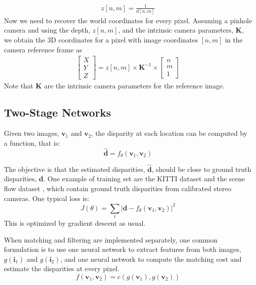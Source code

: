 \begin{align}
    z \left[n,m \right] = \frac{1}{ d \left[n,m \right] }
\end{align}
Now we need to recover the world coordinates for every pixel.
Assuming a pinhole camera and using the depth, $z \left[n,m \right]$, and the intrinsic camera parameters, $\mathbf{K}$, we obtain the 3D coordinates for a pixel with image coordinates $[n,m]$ in the camera reference frame as
\begin{align}
    \begin{bmatrix}
        X \\
        Y \\
        Z
    \end{bmatrix}
    = z\left[n,m \right] \times \mathbf{K}^{-1} \times
    \begin{bmatrix}
        n \\
        m \\
        1
    \end{bmatrix}
\end{align}
Note that $\mathbf{K}$ are the intrinsic camera parameters for the reference image.

\subsection{Two-Stage Networks}
Given two images, $\mathbf{v}_1$ and $\mathbf{v}_2$, the disparity at each location can be computed by a function, that is:
\begin{equation}
    \hat{\mathbf{d}} = f_{\theta}(\mathbf{v}_1, \mathbf{v}_2)
\end{equation}

The objective is that the estimated disparities, $\hat{\mathbf{d}}$, should be close to ground truth disparities, $\mathbf{d}$. One example of training set are the KITTI dataset \cite{Geiger2013} and the scene flow dataset \cite{Mayer2016}, which contain ground truth disparities  from calibrated stereo cameras. One typical loss is:
\begin{equation}
    J(\theta) = \sum_t \left| \mathbf{d} - f_{\theta} (\mathbf{v}_1, \mathbf{v}_2) \right|^2
\end{equation}
This is optimized by gradient descent as usual.


When matching and filtering are implemented separately, one common formulation is to use one neural network to extract features from both images, $g(\mathbf{i}_1)$ and $g(\mathbf{i}_2)$, and one neural network to compute the matching cost and estimate the disparities at every pixel.
\begin{equation}
    f(\mathbf{v}_1, \mathbf{v}_2) = c \left( g(\mathbf{v}_1), g(\mathbf{v}_2) \right)
\end{equation}


